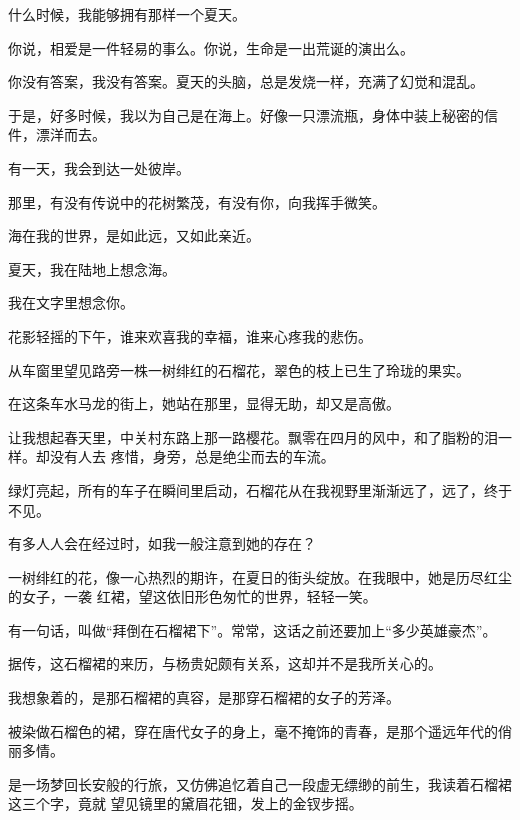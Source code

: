 		\vspace{1em}
		什么时候，我能够拥有那样一个夏天。

		\vspace{1em}
		你说，相爱是一件轻易的事么。你说，生命是一出荒诞的演出么。\par
		你没有答案，我没有答案。夏天的头脑，总是发烧一样，充满了幻觉和混乱。\par
		于是，好多时候，我以为自己是在海上。好像一只漂流瓶，身体中装上秘密的信件，漂洋而去。\par
		有一天，我会到达一处彼岸。\par
		那里，有没有传说中的花树繁茂，有没有你，向我挥手微笑。\par
		海在我的世界，是如此远，又如此亲近。

		\vspace{1em}
		夏天，我在陆地上想念海。\par
		我在文字里想念你。

	\endwriting




		花影轻摇的下午，谁来欢喜我的幸福，谁来心疼我的悲伤。



		从车窗里望见路旁一株一树绯红的石榴花，翠色的枝上已生了玲珑的果实。

		在这条车水马龙的街上，她站在那里，显得无助，却又是高傲。

		让我想起春天里，中关村东路上那一路樱花。飘零在四月的风中，和了脂粉的泪一样。却没有人去
	疼惜，身旁，总是绝尘而去的车流。

		绿灯亮起，所有的车子在瞬间里启动，石榴花从在我视野里渐渐远了，远了，终于不见。

		有多人人会在经过时，如我一般注意到她的存在？

		一树绯红的花，像一心热烈的期许，在夏日的街头绽放。在我眼中，她是历尽红尘的女子，一袭
	红裙，望这依旧形色匆忙的世界，轻轻一笑。

		\vspace{1em}
		有一句话，叫做“拜倒在石榴裙下”。常常，这话之前还要加上“多少英雄豪杰”。\par
		据传，这石榴裙的来历，与杨贵妃颇有关系，这却并不是我所关心的。\par
		我想象着的，是那石榴裙的真容，是那穿石榴裙的女子的芳泽。\par
		被染做石榴色的裙，穿在唐代女子的身上，毫不掩饰的青春，是那个遥远年代的俏丽多情。

		是一场梦回长安般的行旅，又仿佛追忆着自己一段虚无缥缈的前生，我读着石榴裙这三个字，竟就
	望见镜里的黛眉花钿，发上的金钗步摇。

